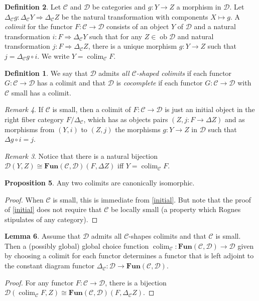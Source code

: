 \documentclass[10pt,letterpaper,cm]{nupset}
\theoremstyle{definition}
\newtheorem{definition}{Definition}
\theoremstyle{theorem}
\newtheorem{lemma}[definition]{Lemma}
\newtheorem{prop}[definition]{Proposition}
\theoremstyle{remark}
\newtheorem{remark}[definition]{Remark}
\newcommand{\1}{\mathbf{1}}
\renewcommand{\c}{\mathscr{C}}
\renewcommand{\d}{\mathscr{D}}
\newcommand{\0}{\vec 0}
\DeclareMathOperator{\ob}{ob}
\DeclareMathOperator{\colim}{colim}
\begin{document}
\begin{definition}
Let $\c$ and $\d$ be categories and $g: Y \to Z$ a morphism in $\d$. Let $\Delta_{\c} g : \Delta_{\c} Y \Rightarrow \Delta_{\c} Z$ be the natural transformation with components $X \mapsto g$. A \textit{colimit} for the functor $F: \c \to \d$ consists of an object $Y$ of $\d$ and a natural transformation $i : F \Rightarrow \Delta_{\c} Y$ such that for any $Z \in \ob \d$ and natural transformation $j: F \Rightarrow \Delta_{\c} Z$, there is a unique morphism $g: Y \to Z$ such that $j = \Delta_{\c}g \circ i$. We write $Y = \colim_{\c} F$.
\begin{definition} We say that $\d$ admits \textit{all $\c$-shaped colimits} if each functor $G: \c \to \d$ has a colimit and that $\d$ is \textit{cocomplete} if each functor $G : \c \to \d$ with $\c$ small has a colimit.
\end{definition}
\end{definition}

\begin{remark}
If $\c$ is small, then a colimit of $F: \c \to \d$ is just an initial object in the right fiber category $F/\Delta_{\c}$, which has as objects pairs $(Z, j: F \to \Delta Z)$ and as morphisms from $(Y, i)$ to $(Z, j)$ the morphisms $g : Y \to Z$ in $\d$ such that $\Delta g \circ i = j$.
\begin{remark}
Notice that there is a natural bijection $\d(Y, Z) \cong \mathbf{Fun}(\c, \d)(F, \Delta Z)$ iff $Y = \colim_{\c}F$.
\end{remark}
\end{remark}

\begin{prop}
Any two colimits are canonically isomorphic.
\end{prop}
\begin{proof}
When $\c$ is small, this is immediate from \cref{initial}. But note that the proof of \cref{initial} does not require that $\c$ be locally small (a property which Rognes stipulates of any category). 
\end{proof}

\begin{lemma}
Assume that $\d$ admits all $\c$-shapes colimits and that $\c$ is small. Then a (possibly global) global choice function $\colim_\c : \mathbf{Fun}(\c, \d) \to \d$ given by choosing a colimit for each functor determines a functor that is left adjoint to the constant diagram functor $\Delta_{\c} : \d \to \mathbf{Fun}(\c, \d)$.
\end{lemma}
\begin{proof}
For any functor $F : \c \to \d$, there is a bijection $\d(\colim_{\c} F, Z) \cong \mathbf{Fun}(\c, \d)(F, \Delta_{\c}Z)$.
\end{proof}
\end{document}
